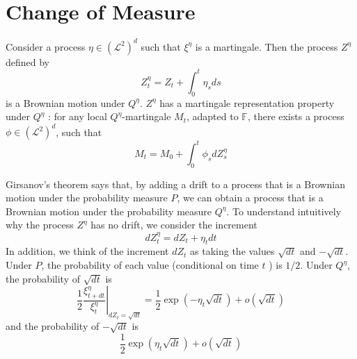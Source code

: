 \documentclass[\topdir/lecture\_notes.tex]{subfiles}
\begin{document}

\section{Change of Measure}
\begin{theorem}\label{thm: thm_273} 
Consider a process $\eta \in\left(\mathcal{L}^{2}\right)^{d}$ such that $\xi^{\eta}$ is a martingale. Then the process $Z^{\eta}$ defined by
\begin{equation}
Z_{t}^{\eta}=Z_{t}+\int_{0}^{t} \eta_{s} d s \label{2.7.3}
\end{equation}
is a Brownian motion under $Q^{\eta}$.
$Z^{\eta}$ has a martingale representation property under $Q^{\eta}$ : for any local $Q^{\eta}$-martingale $M_{t}$, adapted to $\mathbb{F}$, there exists a process $\phi \in\left(\mathcal{L}^{2}\right)^{d}$, such that
\begin{equation*}
M_{t}=M_{0}+\int_{0}^{t} \phi_{s} d Z_{s}^{\eta}
\end{equation*}
\end{theorem}
Girsanov's theorem says that, by adding a drift to a process that is a Brownian motion under the probability measure $P$, we can obtain a process that is a Brownian motion under the probability measure $Q^{\eta}$. To understand intuitively why the process $Z^{\eta}$ has no drift, we consider the increment
\begin{equation*}
d Z_{t}^{\eta}=d Z_{t}+\eta_{t} d t
\end{equation*}
In addition, we think of the increment $d Z_{t}$ as taking the values $\sqrt{d t}$ and $-\sqrt{d t}$. Under $P$, the probability of each value (conditional on time $t$ ) is $1 / 2$. Under $Q^{\eta}$, the probability of $\sqrt{d t}$ is
\begin{equation*}
\left.\frac{1}{2} \frac{\xi_{t+d t}^{\eta}}{\xi_{t}^{\eta}}\right|_{d Z_{t}=\sqrt{d t}}=\frac{1}{2} \exp \left(-\eta_{t} \sqrt{d t}\right)+o(\sqrt{d t})
\end{equation*}
and the probability of $-\sqrt{d t}$ is
\begin{equation*}
\frac{1}{2} \exp \left(\eta_{t} \sqrt{d t}\right)+o(\sqrt{d t})
\end{equation*}
\end{document}
